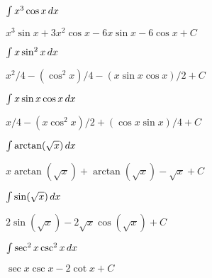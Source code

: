 \begin{exercises}
\begin{exercise} $\int x^3\cos x\, d x$
\begin{answer} $x^3\sin x+3x^2\cos x-6x\sin x-6\cos x+C$
\end{answer}\end{exercise}

\begin{exercise} $\int x\sin^2 x\, d x$
\begin{answer} $x^2/4-(\cos^2 x)/4-(x\sin x\cos x)/2+C$
\end{answer}\end{exercise}

\begin{exercise} $\int x\sin x\cos x\, d x$
\begin{answer} $x/4-(x\cos^2 x)/2+(\cos x\sin x)/4+C$
\end{answer}\end{exercise}

\begin{exercise} $\int \arctan(\sqrt x)\, d x$
\begin{answer} $x\arctan(\sqrt x)+\arctan(\sqrt x)-\sqrt{x}+C$
\end{answer}\end{exercise}

\begin{exercise} $\int \sin(\sqrt x)\, d x$
\begin{answer} $2\sin(\sqrt x)-2\sqrt x\cos(\sqrt x)+C$
\end{answer}\end{exercise}

\begin{exercise} $\int\sec^2 x\csc^2 x\, d x$
\begin{answer} $\sec x\csc x-2\cot x+C$
\end{answer}\end{exercise}

\endtwocol

\end{exercises}
